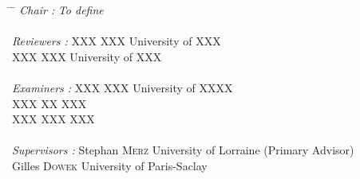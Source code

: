 \begin{titlepage}
\begin{addmargin}[-1cm]{-3cm}
        \begin{center}
        \vspace{1.5em}
        \begin{tabbing}
        \hspace{3cm} \= \hspace{5cm} \= \kill
        \textit{Chair :} \> \textit{To define} \\
        \\
        \textit{Reviewers :} \> XXX \textsc{XXX} \> University of XXX \\
        \> XXX \textsc{XXX} \> University of XXX \\
        \\
        \textit{Examiners :} \> XXX \textsc{XXX} \> University of XXXX \\
        \> XXX \textsc{XX} \> XXX \\
        \> XXX \textsc{XXX} \> XXX \\
        \\
        \textit{Supervisors :} \> Stephan \textsc{Merz} \> University of Lorraine (Primary Advisor) \\
        \> Gilles \textsc{Dowek} \> University of Paris-Saclay \\
        \end{tabbing}
        \end{center}
  \end{addmargin}       
\end{titlepage}   